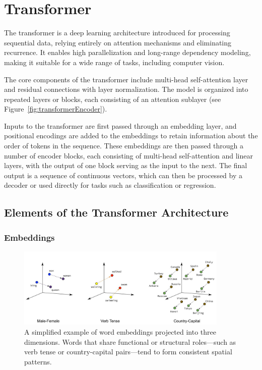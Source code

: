 \documentclass{pracalicmgr}
\begin{document}
\chapter{Transformer}

The transformer is a deep learning architecture introduced for processing sequential data, relying entirely on attention mechanisms and eliminating recurrence. It enables high parallelization and long-range dependency modeling, making it suitable for a wide range of tasks, including computer vision.

The core components of the transformer include multi-head self-attention layer and residual connections with layer normalization. The model is organized into repeated layers or blocks, each consisting of an attention sublayer (see Figure~\ref{fig:transformerEncoder}).

Inputs to the transformer are first passed through an embedding layer, and positional encodings are added to the embeddings to retain information about the order of tokens in the sequence. These embeddings are then passed through a number of encoder blocks, each consisting of multi-head self-attention and linear layers, with the output of one block serving as the input to the next. The final output is a sequence of continuous vectors, which can then be processed by a decoder or used directly for tasks such as classification or regression.

\section{Elements of the Transformer Architecture}

\subsection{Embeddings}

\begin{figure}[h]
    \centering
    \includegraphics[width=0.9\textwidth]{src/word_embeddings_semantics.png}
    \caption{A simplified example of word embeddings projected into three dimensions. Words that share functional or structural roles—such as verb tense or country-capital pairs—tend to form consistent spatial patterns.}
    \label{fig:embedding_example}
\end{figure}
\end{document}
